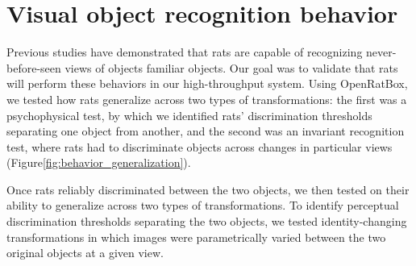 \section{Visual object recognition behavior}
Previous studies have demonstrated that rats are capable of recognizing never-before-seen views of objects familiar objects\cite{Zoccolan2009, Vermaercke2012, Tafazoli2012Transformation-TolerantPriming, REFREF}. Our goal was to validate that rats will perform these behaviors in our high-throughput system. Using OpenRatBox, we tested how rats generalize across two types of transformations: the first was a psychophysical test, by which we identified rats’ discrimination thresholds separating one object from another, and the second was an invariant recognition test, where rats had to discriminate objects across changes in particular views (Figure\ref{fig:behavior_generalization}). 

Once rats reliably discriminated between the two objects, we then tested on their ability to generalize across two types of transformations. To identify perceptual discrimination thresholds separating the two objects, we tested identity-changing transformations in which images were parametrically varied between the two original objects at a given view.

